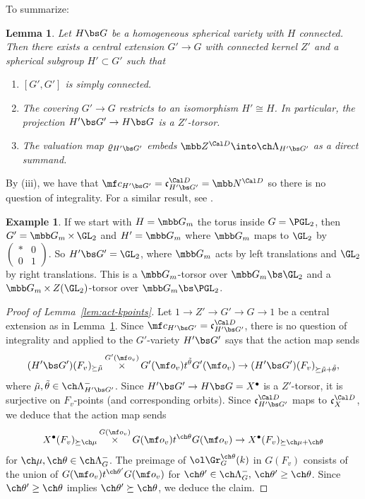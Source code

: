 \documentclass[final]{amsart}
\newtheorem{lem}[subsubsection]{Lemma}
\theoremstyle{remark}
\theoremstyle{definition}
\newtheorem{eg}[subsubsection]{Example}
\DeclareMathOperator*{\xt}{\times}
\numberwithin{equation}{section}
\begin{document}
To summarize:
\begin{lem} \label{lem:Xcover}
Let $H\bs G$ be a homogeneous spherical variety with $H$ connected. 
Then there exists a central extension $G' \to G$ 
with connected kernel $Z'$ and a spherical
subgroup $H'\subset G'$ such that 
\begin{enumerate}
\item $[G',G']$ is simply connected. 
\item The covering $G'\to G$ restricts to an isomorphism $H'\cong H$. 
In particular, 
the projection $H' \bs G' \to H \bs G$ is a $Z'$-torsor.
\item 
The valuation map $\varrho_{H'\bs G'}$ embeds 
$\mbb Z^{\Cal D} \into \ch\Lambda_{H'\bs G'}$
as a direct summand. 
\end{enumerate}
\end{lem}



\noindent By (iii), we have that $\mf c_{H'\bs G'} = \mathfrak c^{\Cal D}_{H'\bs G'}= \mbb N^{\Cal D}$ so there is no question of integrality. For a similar result, see \cite[Lemma 2.1.1]{Brion07}.

\begin{eg}
If we start with $H = \mbb G_m$ the torus inside $G = \PGL_2$, then
$G' = \mbb G_m \xt \GL_2$ and $H'= \mbb G_m$ where $\mbb G_m$ 
maps to $\GL_2$ by $\left( \begin{smallmatrix} * & 0 \\ 0 & 1 \end{smallmatrix} \right)$. So $H'\bs G' = \GL_2$, where $\mbb G_m$ acts by 
left translations and $\GL_2$ by right translations.
This is a $\mbb G_m$-torsor over $\mbb G_m \bs \GL_2$ and a 
$\mbb G_m \xt Z(\GL_2)$-torsor over $\mbb G_m \bs \PGL_2$.
\end{eg}



\begin{proof}[{Proof of Lemma~\ref{lem:act-kpoints}}]
Let $1\to Z'\to G'\to G\to 1$ be a central extension as in Lemma~\ref{lem:Xcover}.  
Since $\mf c_{H'\bs G'} = \mathfrak c^{\Cal D}_{H'\bs G'}$, 
there is no question of integrality and \cite[Lemma 5.5.2]{SV} 
applied to the $G'$-variety $H'\bs G'$ says that 
the action map sends 
\[ (H'\bs G')(F_v)_{\succeq \tilde\mu} \xt^{G'(\mf o_v)} G'(\mf o_v) t^{\tilde\theta} G'(\mf o_v) \to (H'\bs G')(F_v)_{\succeq \tilde\mu+\tilde\theta}, \]
where $\tilde\mu, \tilde\theta \in \ch\Lambda_{H'\bs G'}^-$. 
Since $H'\bs G' \to H\bs G = X^\bullet$ is a $Z'$-torsor, 
it is surjective on $F_v$-points (and corresponding orbits). 
Since $\mathfrak c^{\Cal D}_{H'\bs G'}$ maps to $\mathfrak c_X^{\Cal D}$, 
we deduce that the action map sends 
\[ X^\bullet(F_v)_{\succeq \ch\mu} \xt^{G(\mf o_v)} G(\mf o_v) t^{\ch\theta} G(\mf o_v)
\to X^\bullet(F_v)_{\succeq \ch\mu+\ch\theta} \]
for $\ch\mu,\ch\theta \in \ch\Lambda^-_G$.
The preimage of $\ol\Gr^{\ch\theta}_G(k)$ in $G(F_v)$ consists of the union of 
$G(\mf o_v) t^{\ch\theta'} G(\mf o_v)$ for $\ch\theta'\in \ch\Lambda^-_G,\,
\ch\theta' \ge \ch\theta$. 
Since $\ch\theta' \ge \ch\theta$ implies $\ch\theta' \succeq \ch\theta$, 
we deduce the claim. 
\end{proof}
\end{document}
